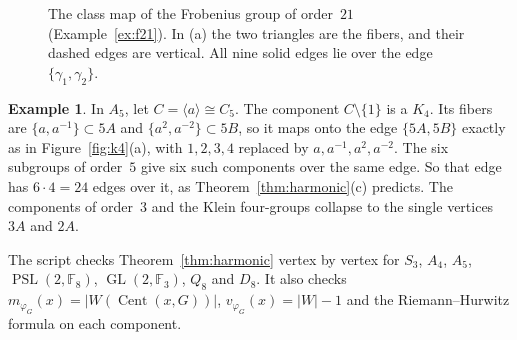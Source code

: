 \documentclass[12pt,letterpaper]{article}
\numberwithin{equation}{section}
\theoremstyle{plain}
\theoremstyle{definition}
\newtheorem{example}[theorem]{Example}
\newcommand{\F}{\mathbb{F}}
\DeclareMathOperator{\Cent}{Cent}
\DeclareMathOperator{\GL}{GL}
\DeclareMathOperator{\PSL}{PSL}
\begin{document}
\begin{figure}[ht]
\centering
{}
\caption{The class map of the Frobenius group of order~$21$
(Example~\ref{ex:f21}). In (a) the two triangles are the fibers, and their
dashed edges are vertical. All nine solid edges lie over the edge
$\{\gamma_1,\gamma_2\}$.}
\label{fig:f21}
\end{figure}

\begin{example}\label{ex:a5harm}
In $A_5$, let $C=\langle a\rangle\cong C_5$. The component $C\setminus\{1\}$
is a $K_4$. Its fibers are $\{a,a^{-1}\}\subset5A$ and $\{a^2,a^{-2}\}
\subset5B$, so it maps onto the edge $\{5A,5B\}$ exactly as in
Figure~\ref{fig:k4}(a), with $1,2,3,4$ replaced by $a,a^{-1},a^2,a^{-2}$. The six subgroups of order~$5$ give six such
components over the same edge. So that edge has $6\cdot4=24$ edges over it,
as Theorem~\ref{thm:harmonic}(c) predicts. The components of order~$3$ and
the Klein four-groups collapse to the single vertices $3A$ and $2A$.
\end{example}

The script checks Theorem~\ref{thm:harmonic} vertex by vertex for $S_3$,
$A_4$, $A_5$, $\PSL(2,\F_8)$, $\GL(2,\F_3)$, $Q_8$ and $D_8$. It also checks
$m_{\varphi_G}(x)=|W(\Cent(x,G))|$, $v_{\varphi_G}(x)=|W|-1$ and the
Riemann--Hurwitz formula on each component.
\end{document}
